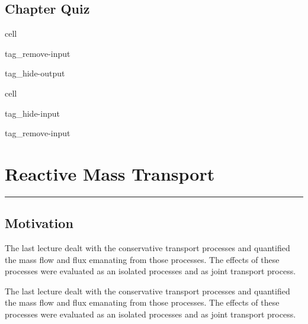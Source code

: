 \documentclass[letterpaper,10pt,english]{jupyterBook}
\begin{document}
\section{Chapter Quiz}
\label{\detokenize{content/transport/L9/21_conservative_transport:chapter-quiz}}
\begin{sphinxuseclass}{cell}
\begin{sphinxuseclass}{tag_remove-input}
\begin{sphinxuseclass}{tag_hide-output}
\end{sphinxuseclass}
\end{sphinxuseclass}
\end{sphinxuseclass}
\sphinxstepscope

\begin{sphinxuseclass}{cell}
\begin{sphinxuseclass}{tag_hide-input}
\begin{sphinxuseclass}{tag_remove-input}
\end{sphinxuseclass}
\end{sphinxuseclass}
\end{sphinxuseclass}

\chapter{Reactive Mass Transport}
\label{\detokenize{content/transport/L10/22_reactive_transport:reactive-mass-transport}}\label{\detokenize{content/transport/L10/22_reactive_transport::doc}}
\sphinxAtStartPar
{}


\bigskip\hrule\bigskip



\section{Motivation}
\label{\detokenize{content/transport/L10/22_reactive_transport:motivation}}
\sphinxAtStartPar
The last lecture dealt with the  conservative transport processes and  quantified the mass flow and flux emanating from those processes. The effects of these processes were evaluated as an isolated processes and as joint transport process.

\sphinxAtStartPar
The last lecture dealt with the  conservative transport processes and  quantified the mass flow and flux emanating from those processes. The effects of these processes were evaluated as an isolated processes and as joint transport process.
\end{document}
